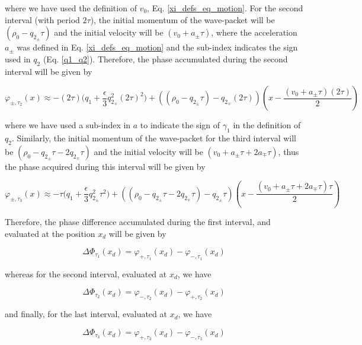 \documentclass{article}
\begin{document}
where we have used the definition of $v_{0}$, Eq. \ref{xi_defs_eq_motion}.
For the second interval (with period $2\tau$), the initial momentum of the wave-packet will be $(\rho_{0} - q_{2_{\pm}} \tau)$ and the initial velocity will be $(v_{0}+a_{\pm}\tau)$, where the acceleration $a_{\pm}$ was defined in Eq. \ref{xi_defs_eq_motion} and the sub-index indicates the sign used in $q_{2}$ (Eq. \ref{q1_q2}). Therefore, the phase accumulated during the second interval will be given by

\begin{equation}\label{approx_quantum_phase_2}
\varphi_{\pm, \tau_{2}}(x) \approx -(2\tau) \bigg(q_{1} + \frac{\epsilon}{3} q_{2_{\mp}}^{2} (2\tau)^{2}\bigg) + ((\rho_{0} - q_{2_{\pm}} \tau)-q_{2_{\mp}} (2\tau))(x-\frac{(v_{0}+a_{\pm}\tau) (2\tau)}{2})
\end{equation}

where we have used a sub-index in $a$ to indicate the sign of $\gamma_{1}$ in the definition of $q_{2}$.
Similarly, the initial momentum of the wave-packet for the third interval will be $(\rho_{0} - q_{2_{\pm}} \tau-2q_{2_{\mp}}\tau)$ and the initial velocity will be $(v_{0}+a_{\pm}\tau + 2 a_{\mp}\tau)$, thus the phase acquired during this interval will be given by

\begin{equation}\label{approx_quantum_phase_3}
\varphi_{\pm, \tau_{3}}(x) \approx -\tau \bigg(q_{1} + \frac{\epsilon}{3} q_{2_{\pm}}^{2} \tau^{2}\bigg) + ((\rho_{0} - q_{2_{\pm}} \tau-2q_{2_{\mp}}\tau)-q_{2_{\pm}} \tau)(x-\frac{(v_{0}+a_{\pm}\tau + 2a_{\mp}\tau) \tau}{2})
\end{equation}

Therefore, the phase difference accumulated during the first interval, and evaluated at the position $x_{d}$ will be given by

\begin{equation}
\Delta \Phi_{\tau_{1}}(x_{d}) = \varphi_{+,\tau_{1}}(x_{d}) - \varphi_{-,\tau_{1}}(x_{d})
\end{equation}

whereas for the second interval, evaluated at $x_{d}$, we have

\begin{equation}
\Delta \Phi_{\tau_{2}}(x_{d}) = \varphi_{-,\tau_{2}}(x_{d}) - \varphi_{+,\tau_{2}}(x_{d})
\end{equation}

and finally, for the last interval, evaluated at $x_{d}$, we have

\begin{equation}
\Delta \Phi_{\tau_{3}}(x_{d}) = \varphi_{+,\tau_{3}}(x_{d}) - \varphi_{-,\tau_{3}}(x_{d})
\end{equation}
\end{document}
